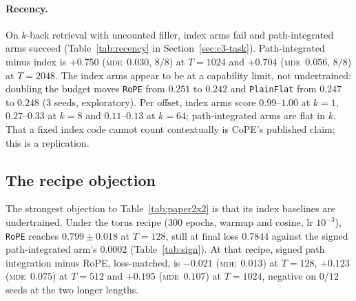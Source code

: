 \documentclass[10pt]{article}
\newcommand{\mde}{\textsc{mde}}
\newcommand{\arm}[1]{\texttt{#1}}
\begin{document}
\paragraph{Recency.} On $k$-back retrieval with uncounted filler, index arms fail and path-integrated
arms succeed (Table~\ref{tab:recency} in Section~\ref{sec:c3-task}). Path-integrated minus index is
$+0.750$ (\mde\ $0.030$, $8/8$) at $T=1024$ and $+0.704$ (\mde\ $0.056$, $8/8$) at $T=2048$. The index
arms appear to be at a capability limit, not undertrained: doubling the budget moves \arm{RoPE} from $0.251$ to
$0.242$ and \arm{PlainFlat} from $0.247$ to $0.248$ (3 seeds, exploratory). Per offset, index arms score
$0.99$--$1.00$ at $k=1$, $0.27$--$0.33$ at $k=8$ and $0.11$--$0.13$ at $k=64$; path-integrated arms are
flat in $k$. That a fixed index code cannot count contextually is CoPE's published claim; this is a
replication. %

\subsection{The recipe objection}
\label{sec:c1-recipe}

The strongest objection to Table~\ref{tab:paper2x2} is that its index baselines are undertrained.
Under the torus recipe (300 epochs, warmup and cosine, lr $10^{-3}$), \arm{RoPE} reaches
$0.799\pm0.018$ at $T=128$, still at final loss $0.7844$ against the signed path-integrated arm's
$0.0002$ (Table~\ref{tab:sign}). At that recipe, signed path integration minus RoPE, loss-matched, is
$-0.021$ (\mde\ $0.013$) at $T=128$, $+0.123$ (\mde\ $0.075$) at $T=512$ and $+0.195$ (\mde\ $0.107$) at
$T=1024$, negative on $0/12$ seeds at the two longer lengths. %
\end{document}
